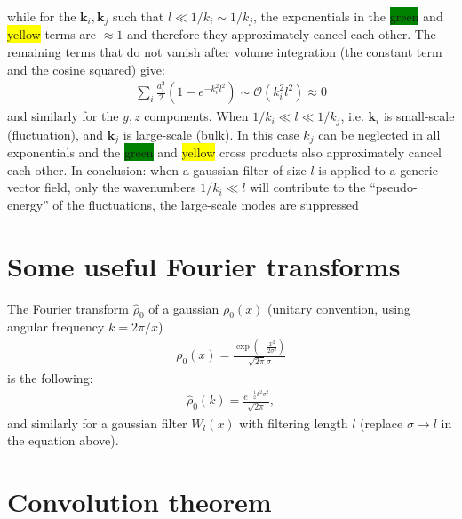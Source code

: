 \documentclass[]{article}
\begin{document}
%
while for the $\bm k_i, \bm k_j$ such that $l \ll 1/k_i \sim 1/k_j$, the exponentials in the \colorbox{green}{green} and \colorbox{yellow}{yellow} terms are $\approx 1$ and therefore they approximately cancel each other. The remaining terms that do not vanish after volume integration (the constant term and the cosine squared) give:
%
\begin{align}
	\sum_i \frac{a_i^2}{2} \left( 1 - e^{- k_i^2 l^2} \right) \sim \mathcal{O} (k_i^2 l^2)  \approx 0
\end{align}
%
and similarly for the $y,z$ components. When $1/k_i \ll l \ll 1/k_j$, i.e. $\bm k_i$ is small-scale (fluctuation), and $\bm k_j$ is large-scale (bulk). In this case $k_j$ can be neglected in all exponentials and the \colorbox{green}{green} and \colorbox{yellow}{yellow} cross products also approximately cancel each other.
In conclusion: when a gaussian filter of size $l$ is applied to a generic vector field, only the wavenumbers $1/k_i \ll l$ will contribute to the ``pseudo-energy'' of the fluctuations, the large-scale modes are suppressed



















\newpage

\appendix

\section{Some useful Fourier transforms}

The Fourier transform $\hat{\rho}_0$ of a gaussian $\rho_0 (x)$ (unitary convention, using angular frequency $k = 2 \pi / x$)
%
\begin{align}
\rho_0 (x) =\frac{\exp \left(-\frac{x^2}{2 \sigma ^2}\right)}{\sqrt{2 \pi } \sigma }
\end{align}
%
is the following:
%
\begin{align}
	\hat{\rho}_0 (k) = \frac{e^{-\frac{1}{2} k^2 \sigma ^2}}{\sqrt{2 \pi }},
\end{align}
%
and similarly for a gaussian filter $W_l (x)$ with filtering length $l$ (replace $\sigma \rightarrow l$ in the equation above).


\section{Convolution theorem}
\end{document}

